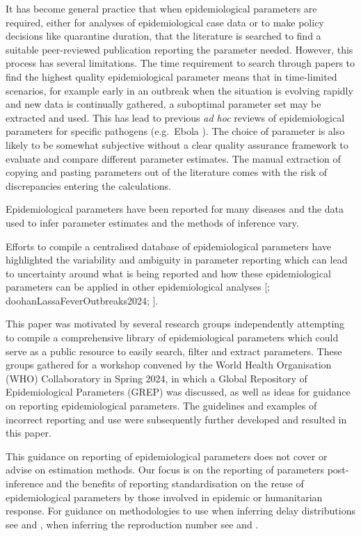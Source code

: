 \documentclass[
  10pt,
  letterpaper,
]{article}
\begin{document}
It has become general practice that when epidemiological parameters are
required, either for analyses of epidemiological case data or to make
policy decisions like quarantine duration, that the literature is
searched to find a suitable peer-reviewed publication reporting the
parameter needed. However, this process has several limitations. The
time requirement to search through papers to find the highest quality
epidemiological parameter means that in time-limited scenarios, for
example early in an outbreak when the situation is evolving rapidly and
new data is continually gathered, a suboptimal parameter set may be
extracted and used. This has lead to previous \emph{ad hoc} reviews of
epidemiological parameters for specific pathogens (e.g.~Ebola
\citep{vankerkhoveReviewEpidemiologicalParameters2015a}). The choice of
parameter is also likely to be somewhat subjective without a clear
quality assurance framework to evaluate and compare different parameter
estimates. The manual extraction of copying and pasting parameters out
of the literature comes with the risk of discrepancies entering the
calculations.

Epidemiological parameters have been reported for many diseases and the
data used to infer parameter estimates and the methods of inference
vary.

Efforts to compile a centralised database of epidemiological parameters
have highlighted the variability and ambiguity in parameter reporting
which can lead to uncertainty around what is being reported and how
these epidemiological parameters can be applied in other epidemiological
analyses {[}\citet{cuomo-dannenburgMarburgVirusDisease2024};
doohanLassaFeverOutbreaks2024; \citet{nashEbolaVirusDisease2024}{]}.

This paper was motivated by several research groups independently
attempting to compile a comprehensive library of epidemiological
parameters which could serve as a public resource to easily search,
filter and extract parameters. These groups gathered for a workshop
convened by the World Health Organisation (WHO) Collaboratory in Spring
2024, in which a Global Repository of Epidemiological Parameters (GREP)
was discussed, as well as ideas for guidance on reporting
epidemiological parameters. The guidelines and examples of incorrect
reporting and use were subsequently further developed and resulted in
this paper.

This guidance on reporting of epidemiological parameters does not cover
or advise on estimation methods. Our focus is on the reporting of
parameters post-inference and the benefits of reporting standardisation
on the reuse of epidemiological parameters by those involved in epidemic
or humanitarian response. For guidance on methodologies to use when
inferring delay distributions see
\citet{parkEstimatingEpidemiologicalDelay2024} and
\citet{charnigaBestPracticesEstimating2024}, when inferring the
reproduction number see \citet{gostic2022} and \citet{abbott2020}.
\end{document}
